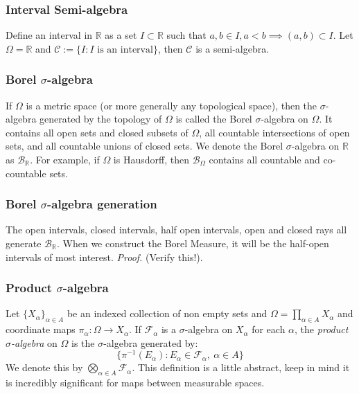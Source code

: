 \documentclass{article}
\begin{document}
\subsubsection{Interval Semi-algebra}
Define an interval in $\mathbb{R}$ as a set $I\subset \mathbb{R}$ such that $a,b\in I, a<b \implies (a,b) \subset I.$ Let $\Omega = \mathbb{R}$ and $\mathcal{C}:= \{I: I \text{ is an interval} \}$, then $\mathcal{C}$ is a semi-algebra.
\subsubsection{Borel $\sigma$-algebra}
If $\Omega$ is a metric space (or more generally any topological space), then the $\sigma$-algebra generated by the topology of $\Omega$ is called the Borel $\sigma$-algebra on $\Omega$. It contains all open sets and closed subsets of $\Omega$, all countable intersections of open sets, and all countable unions of closed sets.\newline \newline
We denote the Borel $\sigma$-algebra on $\mathbb{R}$ as $\mathcal{B}_{\mathbb{R}}$. For example, if $\Omega$ is Hausdorff, then $\mathcal{B}_{\Omega}$ contains all countable and co-countable sets. 

\subsubsection{Borel $\sigma$-algebra generation}
The open intervals, closed intervals, half open intervals, open and closed rays all generate $\mathcal{B}_{\mathbb{R}}$. When we construct the Borel Measure, it will be the half-open intervals of most interest.\newline \newline
\textit{Proof.} \newline \newline
(Verify this!). 

\subsubsection{Product $\sigma$-algebra}
Let $\{X_\alpha\}_{\alpha\in A}$ be an indexed collection of non empty sets and $\Omega=\prod_{\alpha\in A}X_{\alpha}$ and coordinate maps $\pi_{\alpha}:\Omega\to X_{\alpha}$. If $\mathcal{F}_{\alpha}$ is a $\sigma$-algebra on $X_{\alpha}$ for each $\alpha$, the \emph{product $\sigma$-algebra} on $\Omega$ is the $\sigma$-algebra generated by:
\[
\{ \pi^{-1}(E_{\alpha}):E_{\alpha}\in \mathcal{F_{\alpha}}, \ \alpha  \in A\}
\]
We denote this by $\bigotimes_{\alpha\in A}\mathcal{F}_{\alpha}$. This definition is a little abstract, keep in mind it is incredibly significant for  maps between measurable spaces.
\end{document}
